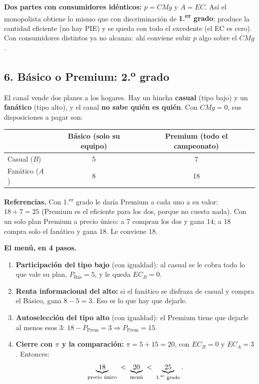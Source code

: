 \documentclass[11pt]{article}
\begin{document}
\begin{clave}
\textbf{Dos partes con consumidores idénticos:} $p = CMg$ y $A = EC$. Así el monopolista obtiene lo mismo que con discriminación de \textbf{1.\textsuperscript{er} grado}: produce la cantidad eficiente (no hay PIE) y se queda con todo el excedente (el EC es cero). Con consumidores distintos ya no alcanza: ahí conviene subir $p$ algo sobre el $CMg$.
\end{clave}

\subsection*{6. Básico o Premium: 2.\textsuperscript{o} grado}

El canal vende dos planes a los hogares. Hay un hincha \textbf{casual} (tipo bajo) y un \textbf{fanático} (tipo alto), y el canal \textbf{no sabe quién es quién}. Con $CMg = 0$, sus disposiciones a pagar son:

\begin{center}
\begin{tabular}{lcc}
\toprule
 & Básico (solo su equipo) & Premium (todo el campeonato) \\
\midrule
Casual ($B$) & 5 & 7 \\
Fanático ($A$) & 8 & 18 \\
\bottomrule
\end{tabular}
\end{center}

\textbf{Referencias.} Con 1.\textsuperscript{er} grado le daría Premium a cada uno a su valor: $18 + 7 = 25$ (Premium es el eficiente para los dos, porque no cuesta nada). Con un solo plan Premium a precio único: a 7 compran los dos y gana $14$; a 18 compra solo el fanático y gana $18$. Le conviene 18.

\textbf{El menú, en 4 pasos.}
\begin{enumerate}[leftmargin=*,itemsep=2pt]
\item \textbf{Participación del tipo bajo} (con igualdad): al casual se le cobra todo lo que vale su plan, $P_{\text{Bás}} = 5$, y le queda $EC_B = 0$.
\item \textbf{Renta informacional del alto:} si el fanático se disfraza de casual y compra el Básico, gana $8 - 5 = 3$. Eso es lo que hay que dejarle.
\item \textbf{Autoselección del tipo alto} (con igualdad): el Premium tiene que dejarle al menos esos 3: $18 - P_{\text{Prem}} = 3 \Rightarrow P_{\text{Prem}} = 15$.
\item \textbf{Cierre con $\pi$ y la comparación:} $\pi = 5 + 15 = 20$, con $EC_B = 0$ y $EC_A = 3$. Entonces:
\[
\underbrace{18}_{\text{precio único}} \;<\; \underbrace{20}_{\text{menú}} \;<\; \underbrace{25}_{\text{1.\textsuperscript{er} grado}} .
\]
\end{enumerate}
\end{document}

